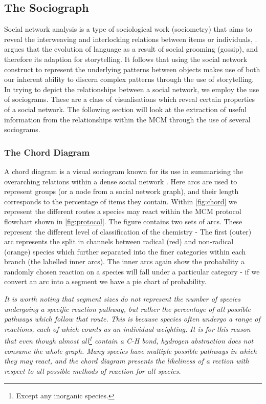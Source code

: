 \subsection{The Sociograph}\label{sec:sociographs}
Social network analysis is a type of sociological work (sociometry) that aims to reveal the interweaving and interlocking relations between items or individuals, \citep{socialorigin}. \citep{gossip} argues that the evolution of language as a result of social grooming (gossip), and therefore its adaption for storytelling. It follows that using the social network construct to represent the underlying patterns between objects makes use of both our inherent ability to discern complex patterns through the use of storytelling. In trying to depict the relationships between a social network, we employ the use of sociograms. These are a class of visualisations which reveal certain properties of a social network. The following section will look at the extraction of useful information from the relationships within the MCM through the use of several sociograms.

\subsubsection{The Chord Diagram}
A chord diagram is a visual sociogram known for its use in summarising the overarching relations within a dense social network \citep{chord}. Here arcs are used to represent groups (or a node from a social network graph), and their length corresponds to the percentage of items they contain. Within \autoref{fig:chord} we represent the different routes a species may react within the MCM protocol flowchart shown in \autoref{fig:protocol}. The figure contains two sets of arcs. These represent the different level of classification of the chemistry - The first (outer) arc represents the split in channels between radical (red) and non-radical (orange) species which further separated into the finer categories within each branch (the labelled inner arcs). The inner arcs again show the probability a randomly chosen reaction on a species will fall under a particular category - if we convert an arc into a segment we have a pie chart of probability.

\textit{It is worth noting that segment sizes do not represent the number of species undergoing a specific reaction pathway, but rather the percentage of all possible pathways which follow that route. This is because species often undergo a range of reactions, each of which counts as an individual weighting. It is for this reason that even though almost all\footnote{ Except any inorganic species.} contain a C-H bond, hydrogen abstraction does not consume the whole graph. Many species have multiple possible pathways in which they may react, and the chord diagram presents the likeliness of a rection with respect to all possible methods of reaction for all species.
}

